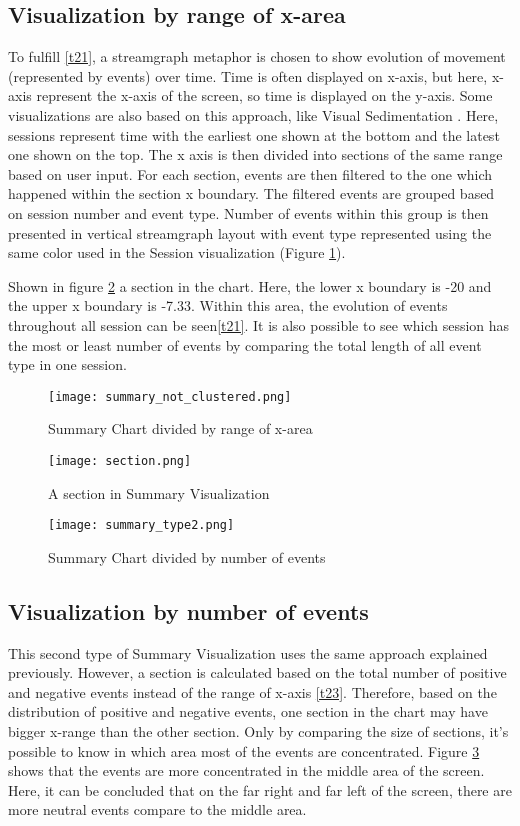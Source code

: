 \subsection{Visualization by range of x-area}
To fulfill \ref{t21}, a streamgraph metaphor is chosen to show evolution of movement (represented by events) over time. 
Time is often displayed on x-axis, but here, x-axis represent the x-axis of the screen, so time is displayed on the y-axis. Some visualizations are also based on this approach, like Visual Sedimentation \cite{huron}. Here, sessions represent time with the earliest one shown at the bottom and the latest one shown on the top. The x axis is then divided into sections of the same range based on user input. For each section, events are then filtered to the one which happened within the section x boundary. The filtered events are grouped based on session number and event type. Number of events within this group is then presented in vertical streamgraph layout with event type represented using the same color used in the Session visualization (Figure  \ref{fig:type1_not_clustered}). 

Shown in figure \ref{fig:type1_section} a section in the chart. Here, the lower x boundary is -20 and the upper x boundary is -7.33. Within this area, the evolution of events throughout all session can be seen\ref{t21}. It is also possible to see which session has the most or least number of events by comparing the total length of all event type in one session. 

\begin{figure}
\centering
\texttt{[image: summary\_not\_clustered.png]}
\caption{Summary Chart divided by range of x-area}
\label{fig:type1_not_clustered}
\end{figure}

\begin{figure}
\centering
\texttt{[image: section.png]}
\caption{A section in Summary Visualization}
\label{fig:type1_section}
\end{figure}

\begin{figure}
\centering
\texttt{[image: summary\_type2.png]}
\caption{Summary Chart divided by number of events}
\label{fig:type2}
\end{figure}

\subsection{Visualization by number of events}
This second type of Summary Visualization uses the same approach explained previously. However, a section is calculated based on the total number of positive and negative events instead of the range of x-axis \ref{t23}. Therefore, based on the distribution of positive and negative events, one section in the chart may have bigger x-range than the other section. Only by comparing the size of sections, it's possible to know in which area most of the events are concentrated. Figure \ref{fig:type2} shows that the events are more concentrated in the middle area of the screen. Here, it can be concluded that on the far right and far left of the screen, there are more neutral events compare to the middle area.

